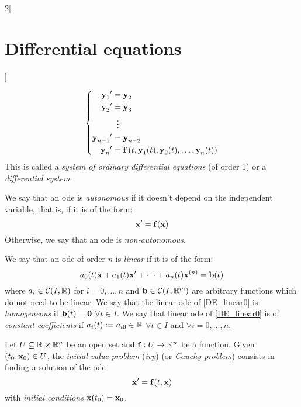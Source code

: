\documentclass[../../../main.tex]{subfiles}
\begin{document}
\begin{multicols}{2}[\section{Differential equations}]
\begin{proposition}
    \begin{equation*}
      \left\{
      \begin{aligned}
        {\boldsymbol{\mathrm{y}}_1}'     & =\boldsymbol{\mathrm{y}}_2                                                        \\
        {\boldsymbol{\mathrm{y}}_2}'     & =\boldsymbol{\mathrm{y}}_3                                                        \\
                        & \;\;\vdots                                                       \\
        {\boldsymbol{\mathrm{y}}_{n-1}}' & =\boldsymbol{\mathrm{y}}_{n-2}                                                    \\
        {\boldsymbol{\mathrm{y}}_n}'     & =\boldsymbol{\mathrm{f}}\left(t,\boldsymbol{\mathrm{y}}_1(t),\boldsymbol{\mathrm{y}}_2(t),\ldots,\boldsymbol{\mathrm{y}}_n(t)\right) \\
      \end{aligned}
      \right.
    \end{equation*}
    This is called a \emph{system of ordinary differential equations} (of order 1) or a \emph{differential system}.
  \end{proposition}
  \begin{definition}
    We say that an ode is \emph{autonomous} if it doesn't depend on the independent variable, that is, if it is of the form: $$\boldsymbol{\mathrm{x}}'=\boldsymbol{\mathrm{f}}(\boldsymbol{\mathrm{x}})$$ Otherwise, we say that an ode is \emph{non-autonomous}.
  \end{definition}
  \begin{definition}
    We say that an ode of order $n$ is \emph{linear} if it is of the form:
    \begin{equation}\label{DE_linear0}
      a_0(t)\boldsymbol{\mathrm{x}}+a_1(t)\boldsymbol{\mathrm{x}}'+\cdots+a_n(t)\boldsymbol{\mathrm{x}}^{(n)}=\boldsymbol{\mathrm{b}}(t)
    \end{equation}
    where $a_i\in\mathcal{C}(I,\mathbb{R})$ for $i=0,\ldots,n$ and $\boldsymbol{\mathrm{b}}\in\mathcal{C}(I,\mathbb{R}^m)$ are arbitrary functions which do not need to be linear. We say that the linear ode of \cref{DE_linear0} is \emph{homogeneous} if $\boldsymbol{\mathrm{b}}(t)=\boldsymbol{\mathrm{0}}$ $\forall t\in I$. We say that linear ode of \cref{DE_linear0} is of \emph{constant coefficients} if $a_i(t):=a_{i0}\in\mathbb{R}$ $\forall t\in I$ and $\forall i=0,\ldots,n$.
  \end{definition}
  \begin{definition}
    Let $U\subseteq\mathbb{R}\times\mathbb{R}^n$ be an open set and $\boldsymbol{\mathrm{f}}:U\rightarrow\mathbb{R}^n$ be a function. Given $(t_0,\boldsymbol{\mathrm{x}}_0)\in U$, the \emph{initial value problem} (\emph{ivp}) (or \emph{Cauchy problem}) consists in finding a solution of the ode $$\boldsymbol{\mathrm{x}}'=\boldsymbol{\mathrm{f}}(t,\boldsymbol{\mathrm{x}})$$ with \emph{initial conditions} $\boldsymbol{\mathrm{x}}(t_0)=\boldsymbol{\mathrm{x}}_0$.
  \end{definition}

\end{multicols}
\end{document}
